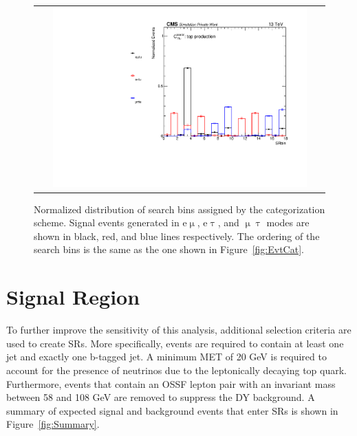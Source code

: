  \begin{figure}[tbh!]
 \begin{center}
 \begin{tabular}{c}
 \includegraphics[width=0.9\textwidth]{figures/Part4/Evt/SRbin}
 \end{tabular}
 \caption{Normalized distribution of search bins assigned by the categorization scheme. Signal events generated in e$\upmu$, e$\uptau$, and $\upmu\uptau$ modes are shown in black, red, and blue lines respectively. The ordering of the search bins is the same as the one shown in Figure~\ref{fig:EvtCat}. }
 \label{fig:SRbin}
 \end{center}
 \end{figure}

\section{Signal Region}
\label{sec:SRInclusive}

To further improve the sensitivity of this analysis, additional selection criteria are used to create \acp{SR}. More specifically, events are required to contain at least one jet and exactly one b-tagged jet. A minimum \ac{MET} of 20 GeV is required to account for the presence of neutrinos due to the leptonically decaying top quark. Furthermore, events that contain an \ac{OSSF} lepton pair with an invariant mass between 58 and 108 GeV are removed to suppress the \ac{DY} background. A summary of expected signal and background events that enter \acp{SR} is shown in Figure~\ref{fig:Summary}.

